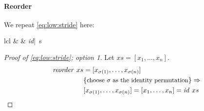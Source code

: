 \paragraph{Reorder}

We repeat \autoref{eq:low:stride} here:
\begin{rerule*}{lcl}
  \reorder & \rightarrow & \textit{id}\quad |\quad \reorderStride\ s
\end{rerule*}

\begin{proof}[Proof of \autoref{eq:low:stride}; option 1]
  Let $xs = [x_1, \ldots, x_n]$.
  \begin{align*}
    \text{\textit{reorder}}\ xs &= [x_{\sigma(1)}, \ldots, x_{\sigma(n)}]\\
                 &\{\text{\small choose $\sigma$ as the identity permutation}\} \Rightarrow\\
                 & [x_{\sigma(1)}, \ldots, x_{\sigma(n)}] = [x_1, \ldots, x_n] = \text{\textit{id}}\ xs
  \end{align*}
\end{proof}

